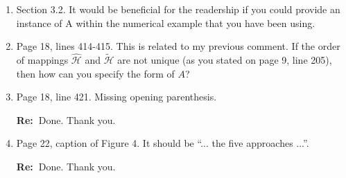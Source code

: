 \documentclass[11pt,a4paper]{article}
\newcommand{\RE}[2][Re:~]{{\color{blue}\textbf{#1}#2}}
\begin{document}
\begin{enumerate}
    \item Section 3.2. It would be beneficial for the readership if you could provide an instance of A within the numerical example that you have been using.
    \item Page 18, lines 414-415. This is related to my previous comment. If the order of mappings $\hat{\mathcal{H}}$ and $\tilde{\mathcal{H}}$ are not unique (as you stated on page 9, line 205), then how can you specify the form of $A$?
    
    

    \item Page 18, line 421. Missing opening parenthesis.
    
    \RE{Done. Thank you.}
    \item Page 22, caption of Figure 4. It should be ``... the five approaches ...''.
    
    \RE{Done. Thank you.}
\end{enumerate}


\newpage


% 
% 
\printbibliography
\end{document}

